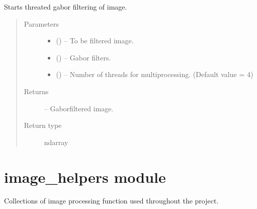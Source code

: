 \documentclass[letterpaper,10pt,english]{sphinxmanual}
\begin{document}

\begin{fulllineitems}
\label{\detokenize{image_gabor:image_gabor.process_threaded}}
Starts threated gabor filtering of image.
\begin{quote}\begin{description}
\item[{Parameters}] \leavevmode\begin{itemize}
\item {} 
 () -- To be filtered image.

\item {} 
 () -- Gabor filters.

\item {} 
 () -- Number of threads for multiprocessing. (Default value = 4)

\end{itemize}

\item[{Returns}] \leavevmode
{} -- Gaborfiltered image.

\item[{Return type}] \leavevmode
ndarray

\end{description}\end{quote}

\end{fulllineitems}



\chapter{image\_helpers module}
\label{\detokenize{image_helpers:image-helpers-module}}\label{\detokenize{image_helpers::doc}}\label{\detokenize{image_helpers:module-image_helpers}}
Collections of image processing function used throughout the project.
\end{document}
